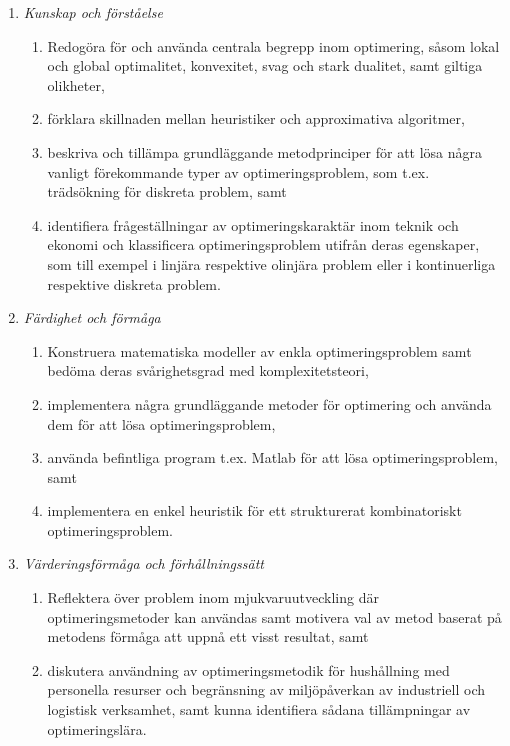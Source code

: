 \begin{enumerate}
\def\labelenumi{\Alph{enumi}.}
\tightlist
\item
  \emph{Kunskap och förståelse}

  \begin{enumerate}
  \def\labelenumii{\arabic{enumii}.}
  \tightlist
  \item
    Redogöra för och använda centrala begrepp inom optimering, såsom
    lokal och global optimalitet, konvexitet, svag och stark dualitet,
    samt giltiga olikheter,
  \item
    förklara skillnaden mellan heuristiker och approximativa algoritmer,
  \item
    beskriva och tillämpa grundläggande metodprinciper för att lösa
    några vanligt förekommande typer av optimeringsproblem, som t.ex.
    trädsökning för diskreta problem, samt
  \item
    identifiera frågeställningar av optimeringskaraktär inom teknik och
    ekonomi och klassificera optimeringsproblem utifrån deras
    egenskaper, som till exempel i linjära respektive olinjära problem
    eller i kontinuerliga respektive diskreta problem.
  \end{enumerate}
\item
  \emph{Färdighet och förmåga}

  \begin{enumerate}
  \def\labelenumii{\arabic{enumii}.}
  \tightlist
  \item
    Konstruera matematiska modeller av enkla optimeringsproblem samt
    bedöma deras svårighetsgrad med komplexitetsteori,
  \item
    implementera några grundläggande metoder för optimering och använda
    dem för att lösa optimeringsproblem,
  \item
    använda befintliga program t.ex. Matlab för att lösa
    optimeringsproblem, samt
  \item
    implementera en enkel heuristik för ett strukturerat kombinatoriskt
    optimeringsproblem.
  \end{enumerate}
\item
  \emph{Värderingsförmåga och förhållningssätt}

  \begin{enumerate}
  \def\labelenumii{\arabic{enumii}.}
  \tightlist
  \item
    Reflektera över problem inom mjukvaruutveckling där
    optimeringsmetoder kan användas samt motivera val av metod baserat
    på metodens förmåga att uppnå ett visst resultat, samt
  \item
    diskutera användning av optimeringsmetodik för hushållning med
    personella resurser och begränsning av miljöpåverkan av industriell
    och logistisk verksamhet, samt kunna identifiera sådana
    tillämpningar av optimeringslära.
  \end{enumerate}
\end{enumerate}

